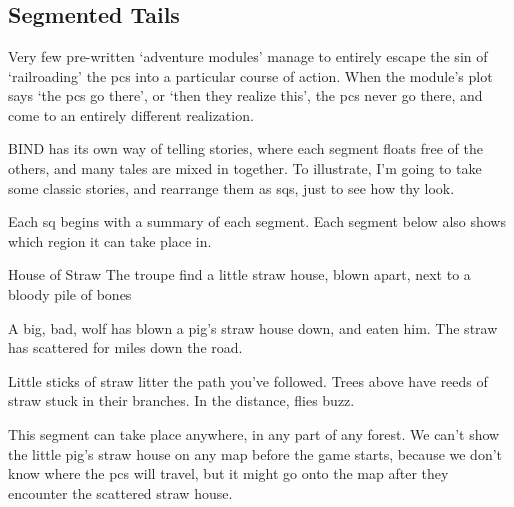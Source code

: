 \chapter{}

\label{sidequests}

\togglefalse{genExamples}

\section{Segmented Tails}

\begin{multicols}{2}

\noindent
Very few pre-written `adventure modules' manage to entirely escape the sin of `railroading' the \glspl{pc} into a particular course of action.
When the module's plot says `the \glspl{pc} go there', or `then they realize this', the \glspl{pc} never go there, and come to an entirely different realization.

BIND has its own way of telling stories, where each \gls{segment} floats free of the others, and many tales are mixed in together.
To illustrate, I'm going to take some classic stories, and rearrange them as \glspl{sq}, just to see how thy look.


Each \gls{sq} begins with a summary of each \gls{segment}.
Each \gls{segment} below also shows which \gls{region} it can take place in.

{House of Straw}%
{The troupe find a little straw house, blown apart, next to a bloody pile of bones}%

\begin{exampletext}
  A big, bad, wolf has blown a pig's straw house down, and eaten him.
  The straw has scattered for miles down the road.
\end{exampletext}

\begin{boxtext}
  Little sticks of straw litter the path you've followed.
  Trees above have reeds of straw stuck in their branches.
  In the distance, flies buzz.
\end{boxtext}

This \gls{segment} can take place anywhere, in any part of any forest.
We can't show the little pig's straw house on any map before the game starts, because we don't know where the \glspl{pc} will travel, but it might go onto the map after they encounter the scattered straw house.


\end{multicols}
